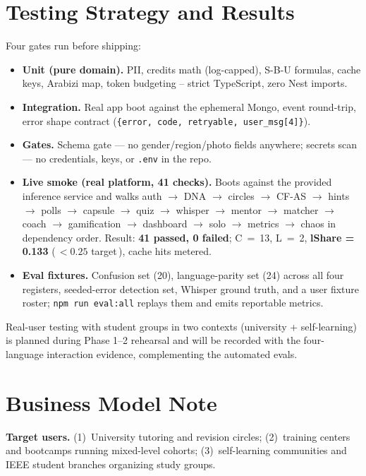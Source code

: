 \documentclass[10pt,twocolumn]{IEEEtran}
\newcommand{\trip}[1]{\textcolor{accg}{\textbf{#1}}}
\begin{document}
\section{Testing Strategy and Results}
Four gates run before shipping:

\begin{itemize}
\item \textbf{Unit (pure domain).} PII, credits math (log-capped), S-B-U formulas, cache keys, Arabizi map, token budgeting \--- strict TypeScript, zero Nest imports.
\item \textbf{Integration.} Real app boot against the ephemeral Mongo, event round-trip, error shape contract (\texttt{\{error, code, retryable, user\_msg[4]\}}).
\item \textbf{Gates.} Schema gate --- no gender/region/photo fields anywhere; secrets scan --- no credentials, keys, or \texttt{.env} in the repo.
\item \textbf{Live smoke (real platform, 41 checks).} Boots against the provided inference service and walks auth $\rightarrow$ DNA $\rightarrow$ circles $\rightarrow$ CF-AS $\rightarrow$ hints $\rightarrow$ polls $\rightarrow$ capsule $\rightarrow$ quiz $\rightarrow$ whisper $\rightarrow$ mentor $\rightarrow$ matcher $\rightarrow$ coach $\rightarrow$ gamification $\rightarrow$ dashboard $\rightarrow$ solo $\rightarrow$ metrics $\rightarrow$ chaos in dependency order. Result: \trip{41 passed, 0 failed}; C~=~13, L~=~2, \trip{lShare = 0.133} (\,$<0.25$ target\,), cache hits metered.
\item \textbf{Eval fixtures.} Confusion set (20), language-parity set (24) across all four registers, seeded-error detection set, Whisper ground truth, and a user fixture roster; \texttt{npm run eval:all} replays them and emits reportable metrics.
\end{itemize}

Real-user testing with student groups in two contexts (university + self-learning) is planned during Phase 1--2 rehearsal and will be recorded with the four-language interaction evidence, complementing the automated evals.

\section{Business Model Note}
\textbf{Target users.} (1)~University tutoring and revision circles; (2)~training centers and bootcamps running mixed-level cohorts; (3)~self-learning communities and IEEE student branches organizing study groups.
\end{document}
